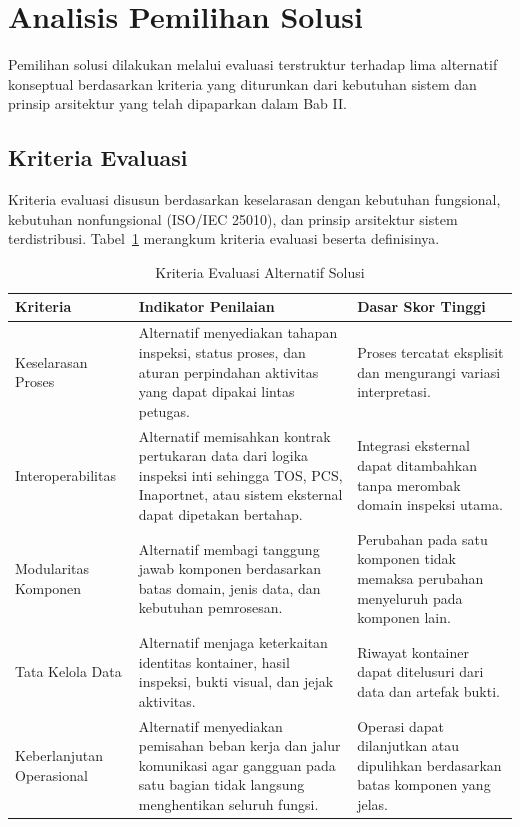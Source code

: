 \FloatBarrier

\section{Analisis Pemilihan Solusi}

Pemilihan solusi dilakukan melalui evaluasi terstruktur terhadap lima alternatif konseptual berdasarkan kriteria yang diturunkan dari kebutuhan sistem dan prinsip arsitektur yang telah dipaparkan dalam Bab II.

\subsection{Kriteria Evaluasi}

Kriteria evaluasi disusun berdasarkan keselarasan dengan kebutuhan fungsional, kebutuhan nonfungsional (ISO/IEC 25010), dan prinsip arsitektur sistem terdistribusi. Tabel~\ref{tbl:kriteria_evaluasi} merangkum kriteria evaluasi beserta definisinya.

\begin{table}[ht]
\centering
\footnotesize
\caption{Kriteria Evaluasi Alternatif Solusi}
\label{tbl:kriteria_evaluasi}
\setlength{\tabcolsep}{4pt}
\renewcommand{\arraystretch}{1.12}
\begin{tabularx}{\textwidth}{>{\raggedright\arraybackslash}p{} >{\raggedright\arraybackslash}X >{\raggedright\arraybackslash}p{}}
\toprule
\textbf{Kriteria} & \textbf{Indikator Penilaian} & \textbf{Dasar Skor Tinggi} \\
\midrule
Keselarasan Proses & Alternatif menyediakan tahapan inspeksi, status proses, dan aturan perpindahan aktivitas yang dapat dipakai lintas petugas. & Proses tercatat eksplisit dan mengurangi variasi interpretasi. \\
Interoperabilitas & Alternatif memisahkan kontrak pertukaran data dari logika inspeksi inti sehingga TOS, PCS, Inaportnet, atau sistem eksternal dapat dipetakan bertahap. & Integrasi eksternal dapat ditambahkan tanpa merombak domain inspeksi utama. \\
Modularitas Komponen & Alternatif membagi tanggung jawab komponen berdasarkan batas domain, jenis data, dan kebutuhan pemrosesan. & Perubahan pada satu komponen tidak memaksa perubahan menyeluruh pada komponen lain. \\
Tata Kelola Data & Alternatif menjaga keterkaitan identitas kontainer, hasil inspeksi, bukti visual, dan jejak aktivitas. & Riwayat kontainer dapat ditelusuri dari data dan artefak bukti. \\
Keberlanjutan Operasional & Alternatif menyediakan pemisahan beban kerja dan jalur komunikasi agar gangguan pada satu bagian tidak langsung menghentikan seluruh fungsi. & Operasi dapat dilanjutkan atau dipulihkan berdasarkan batas komponen yang jelas. \\
\bottomrule
\end{tabularx}
\end{table}

